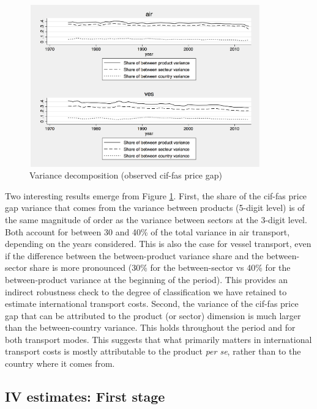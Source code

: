 \documentclass[a4paper,11pt]{article}
\begin{document}
\begin{figure}[htbp]
\caption{Variance decomposition (observed cif-fas price gap)}
\label{fig:decomp_variance}
\begin{center}
\includegraphics[width=10cm, height=7cm]{variance_decomposition.pdf}
\end{center}
\end{figure}


Two interesting results emerge from Figure \ref{fig:decomp_variance}.
First, the share of the cif-fas price gap variance that comes from the variance between products (5-digit level) is of the same magnitude of order as the variance between sectors at the 3-digit level.
Both account for between 30 and 40\% of the total variance in air transport, depending on the years considered.
This is also the case for vessel transport, even if the difference between the between-product variance share and the between-sector share is more pronounced (30\% for the between-sector vs 40\% for the between-product variance at the beginning of the period).
This provides an indirect robustness check to the degree of classification we have retained to estimate international transport costs.
Second, the variance of the cif-fas price gap that can be attributed to the product (or sector) dimension is much larger than the between-country variance.
This holds throughout the period and for both transport modes.
This suggests that what primarily matters in international transport costs is mostly attributable to the product \textit{per se}, rather than to the country where it comes from.



\subsection{IV estimates: First stage \label{app:first_stage_IV}}
\end{document}

